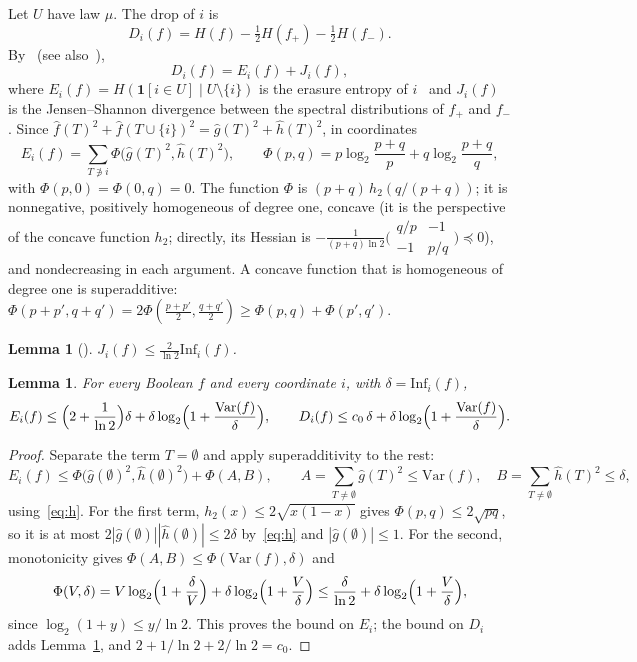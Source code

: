 \documentclass[11pt]{amsart}
\newtheorem{lemma}[theorem]{Lemma}
\theoremstyle{remark}
\newcommand{\Inf}{\mathrm{Inf}}
\newcommand{\Var}{\mathrm{Var}}
\begin{document}
Let $U$ have law $\mu$. The drop of $i$ is
\[
D_i(f)=H(f)-\tfrac12H(f_+)-\tfrac12H(f_-).
\]
By~\cite[Appendix~B]{GMP} (see also~\cite[Lemma~2]{Shm1}),
\[
D_i(f)=E_i(f)+J_i(f),
\]
where $E_i(f)=H(\mathbf 1[i\in U]\mid U\setminus\{i\})$ is the erasure entropy of $i$~\cite{VW08} and $J_i(f)$ is the
Jensen--Shannon divergence between the spectral distributions of $f_+$ and $f_-$. Since
$\hat f(T)^2+\hat f(T\cup\{i\})^2=\hat g(T)^2+\hat h(T)^2$, in coordinates
\[
E_i(f)=\sum_{T\not\ni i}\Phi\bigl(\hat g(T)^2,\hat h(T)^2\bigr),\qquad
\Phi(p,q)=p\log_2\frac{p+q}{p}+q\log_2\frac{p+q}{q},
\]
with $\Phi(p,0)=\Phi(0,q)=0$. The function $\Phi$ is $(p+q)\,h_2(q/(p+q))$; it is nonnegative, positively homogeneous of
degree one, concave (it is the perspective of the concave function $h_2$; directly, its Hessian is $-\frac{1}{(p+q)\ln2}\bigl(\begin{smallmatrix}q/p&-1\\-1&p/q\end{smallmatrix}\bigr)\preceq0$), and
nondecreasing in each argument. A concave function that is homogeneous of degree one is superadditive:
$\Phi(p+p',q+q')=2\Phi(\frac{p+p'}2,\frac{q+q'}2)\ge\Phi(p,q)+\Phi(p',q')$.

\begin{lemma}[{\cite[Lemma 3]{Shm1}}]\label{lem:jsd}
$J_i(f)\le\frac2{\ln2}\Inf_i(f)$.
\end{lemma}

\begin{lemma}\label{lem:step}
For every Boolean $f$ and every coordinate $i$, with $\delta=\Inf_i(f)$,
\[
E_i(f)\le\Bigl(2+\frac1{\ln 2}\Bigr)\delta+\delta\log_2\Bigl(1+\frac{\Var(f)}{\delta}\Bigr),
\qquad
D_i(f)\le c_0\,\delta+\delta\log_2\Bigl(1+\frac{\Var(f)}{\delta}\Bigr).
\]
\end{lemma}

\begin{proof}
Separate the term $T=\emptyset$ and apply superadditivity to the rest:
\[
E_i(f)\le\Phi\bigl(\hat g(\emptyset)^2,\hat h(\emptyset)^2\bigr)+\Phi(A,B),\qquad
A=\sum_{T\ne\emptyset}\hat g(T)^2\le\Var(f),\quad B=\sum_{T\ne\emptyset}\hat h(T)^2\le\delta,
\]
using~\eqref{eq:h}. For the first term, $h_2(x)\le2\sqrt{x(1-x)}$ gives $\Phi(p,q)\le2\sqrt{pq}$, so it is at most
$2|\hat g(\emptyset)||\hat h(\emptyset)|\le2\delta$ by~\eqref{eq:h} and $|\hat g(\emptyset)|\le1$. For the second,
monotonicity gives $\Phi(A,B)\le\Phi(\Var(f),\delta)$ and
\[
\Phi(V,\delta)=V\log_2\Bigl(1+\frac\delta V\Bigr)+\delta\log_2\Bigl(1+\frac V\delta\Bigr)\le\frac{\delta}{\ln2}+\delta\log_2\Bigl(1+\frac V\delta\Bigr),
\]
since $\log_2(1+y)\le y/\ln 2$. This proves the bound on $E_i$; the bound on $D_i$ adds Lemma~\ref{lem:jsd}, and
$2+1/\ln2+2/\ln2=c_0$.
\end{proof}
\end{document}
